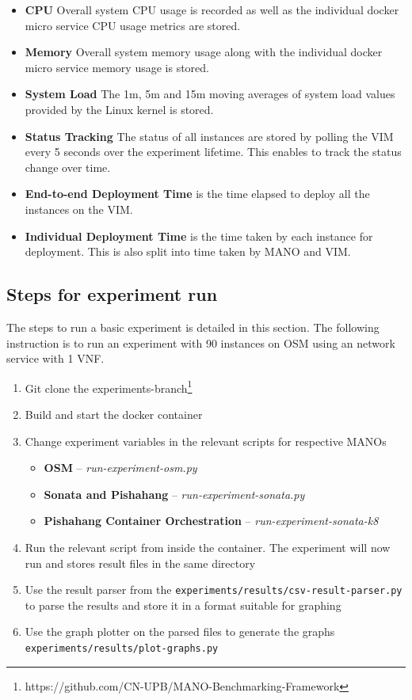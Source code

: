 \begin{itemize}
	\item{\textbf{CPU}} Overall system CPU usage is recorded as well as the individual docker micro service CPU usage metrics are stored.
	\item{\textbf{Memory}} Overall system memory usage along with the individual docker micro service memory usage is stored.
	\item{\textbf{System Load}} The 1m, 5m and 15m moving averages of system load values provided by the Linux kernel is stored.
	\item{\textbf{Status Tracking}} The status of all instances are stored by polling the VIM every 5 seconds over the experiment lifetime. 
	This enables to track the status change over time.
	\item{\textbf{End-to-end Deployment Time}} is the time elapsed to deploy all the instances on the VIM.
	\item{\textbf{Individual Deployment Time}} is the time taken by each instance for deployment. 
	This is also split into time taken by MANO and VIM.
\end{itemize}

\subsection{Steps for experiment run} 

The steps to run a basic experiment is detailed in this section. 
The following instruction is to run an experiment with 90 instances on OSM using an network service with 1 VNF. 

\begin{enumerate}
	\item Git clone the experiments-branch\footnote{https://github.com/CN-UPB/MANO-Benchmarking-Framework}
	\item Build and start the docker container
	\item Change experiment variables in the relevant scripts for respective MANOs
	\begin{itemize}
		\item \textbf{OSM} -- \textit{run-experiment-osm.py}
		\item \textbf{Sonata and Pishahang}  -- \textit{run-experiment-sonata.py}
		\item \textbf{Pishahang Container Orchestration} -- \textit{run-experiment-sonata-k8}
	\end{itemize}
	
	\item Run the relevant script from inside the container. 
	The experiment will now run and stores result files in the same directory
	\item Use the result parser from the \texttt{experiments/results/csv-result-parser.py} to parse the results and store it in a format suitable for graphing
	\item Use the graph plotter on the parsed files to generate the graphs\\ \texttt{experiments/results/plot-graphs.py}
	
	\end{enumerate}

